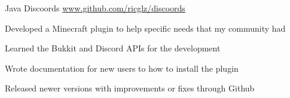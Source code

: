 \begin{cventries}

  \cventry
    {Java}
    {Discoords}
    {}
    {\url{www.github.com/ricglz/discoords}}
    {
      \begin{cvitems}
        \item {Developed a Minecraft plugin to help specific needs that my community had}
        \item {Learned the Bukkit and Discord APIs for the development}
        \item {Wrote documentation for new users to how to install the plugin}
        \item {Released newer versions with improvements or fixes through Github}
      \end{cvitems}
    }

\end{cventries}
